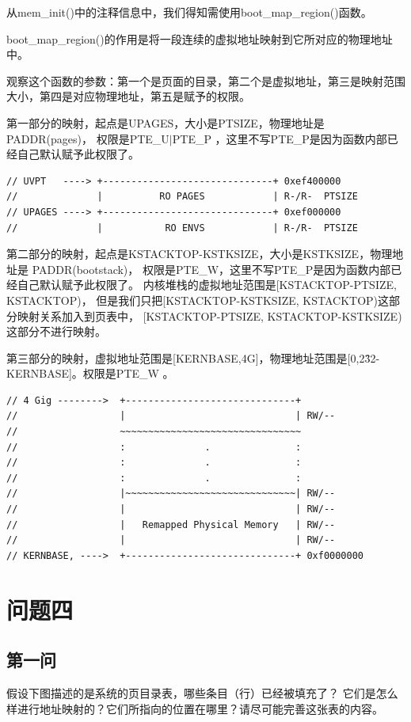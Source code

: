 \documentclass[12pt,a4paper,UTF8]{article}
\begin{document}
    从mem\_init()中的注释信息中，我们得知需使用boot\_map\_region()函数。

    boot\_map\_region()的作用是将一段连续的虚拟地址映射到它所对应的物理地址中。
    
    观察这个函数的参数：第一个是页面的目录，第二个是虚拟地址，第三是映射范围大小，第四是对应物理地址，第五是赋予的权限。

    第一部分的映射，起点是UPAGES，大小是PTSIZE，物理地址是PADDR(pages)，
    权限是PTE\_U$|$PTE\_P ，这里不写PTE\_P是因为函数内部已经自己默认赋予此权限了。

    \begin{lstlisting}[style=CPP]
// UVPT   ----> +------------------------------+ 0xef400000
//              |          RO PAGES            | R-/R-  PTSIZE
// UPAGES ----> +------------------------------+ 0xef000000
//              |           RO ENVS            | R-/R-  PTSIZE
    \end{lstlisting}

    第二部分的映射，起点是KSTACKTOP-KSTKSIZE，大小是KSTKSIZE，物理地址是 PADDR(bootstack)，
    权限是PTE\_W，这里不写PTE\_P是因为函数内部已经自己默认赋予此权限了。
    内核堆栈的虚拟地址范围是[KSTACKTOP-PTSIZE, KSTACKTOP)，
    但是我们只把[KSTACKTOP-KSTKSIZE, KSTACKTOP)这部分映射关系加入到页表中，
    [KSTACKTOP-PTSIZE, KSTACKTOP-KSTKSIZE)这部分不进行映射。

    第三部分的映射，虚拟地址范围是[KERNBASE,4G]，物理地址范围是[0,2\^32-KERNBASE]。权限是PTE\_W 。 

    \begin{lstlisting}[style=CPP]
// 4 Gig -------->  +------------------------------+
//                  |                              | RW/--
//                  ~~~~~~~~~~~~~~~~~~~~~~~~~~~~~~~~
//                  :              .               :
//                  :              .               :
//                  :              .               :
//                  |~~~~~~~~~~~~~~~~~~~~~~~~~~~~~~| RW/--
//                  |                              | RW/--
//                  |   Remapped Physical Memory   | RW/--
//                  |                              | RW/--
// KERNBASE, ---->  +------------------------------+ 0xf0000000
    \end{lstlisting}


\section{问题四}
    \subsection{第一问}
    假设下图描述的是系统的页目录表，哪些条目（行）已经被填充了？
    它们是怎么样进行地址映射的？它们所指向的位置在哪里？请尽可能完善这张表的内容。
    
\end{document}
